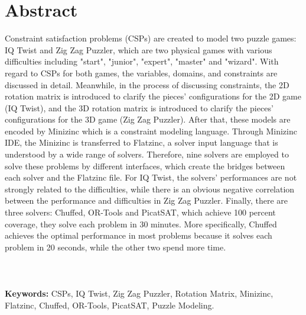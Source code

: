 \chapter*{Abstract}
\vspace{-1em}
Constraint satisfaction problems (CSPs) are created to model two puzzle games: IQ Twist and Zig Zag Puzzler, which are two physical games with various difficulties including "start", "junior", "expert", "master" and "wizard". With regard to CSPs for both games, the variables, domains, and constraints are discussed in detail. Meanwhile, in the process of discussing constraints, the 2D rotation matrix is introduced to clarify the pieces' configurations for the 2D game (IQ Twist), and the 3D rotation matrix is introduced to clarify the pieces' configurations for the 3D game (Zig Zag Puzzler). After that, these models are encoded by Minizinc which is a constraint modeling language. Through Minizinc IDE, the Minizinc is transferred to Flatzinc, a solver input language that is understood by a wide range of solvers. Therefore, nine solvers are employed to solve these problems by different interfaces, which create the bridges between each solver and the Flatzinc file. For IQ Twist, the solvers' performances are not strongly related to the difficulties, while there is an obvious negative correlation between the performance and difficulties in Zig Zag Puzzler. Finally, there are three solvers: Chuffed, OR-Tools and PicatSAT, which achieve 100 percent coverage, they solve each problem in 30 minutes. More specifically, Chuffed achieves the optimal performance in most problems because it solves each problem in 20 seconds, while the other two spend more time.
\\
\\
\\
\\\textbf{Keywords:} CSPs, IQ Twist, Zig Zag Puzzler, Rotation Matrix, Minizinc, Flatzinc, Chuffed, OR-Tools, PicatSAT, Puzzle Modeling.


